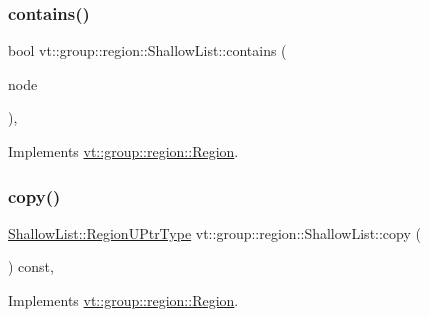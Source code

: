 \subsubsection{\texorpdfstring{contains()}{contains()}}
{\footnotesize\ttfamily bool vt\+::group\+::region\+::\+Shallow\+List\+::contains (\begin{DoxyParamCaption}\item[{\hyperlink{namespacevt_a866da9d0efc19c0a1ce79e9e492f47e2}{Node\+Type} const \&}]{node }\end{DoxyParamCaption})\hspace{0.3cm}{\ttfamily [override]}, {\ttfamily [virtual]}}



Implements \hyperlink{structvt_1_1group_1_1region_1_1_region_a1e0ebd7367476fb397faf06a03b5583c}{vt\+::group\+::region\+::\+Region}.

\mbox{\label{structvt_1_1group_1_1region_1_1_shallow_list_a43434547454d02f9069873282675058f}} 
\subsubsection{\texorpdfstring{copy()}{copy()}}
{\footnotesize\ttfamily \hyperlink{structvt_1_1group_1_1region_1_1_region_ae5f42cf159116a3cf8bd65423eb01037}{Shallow\+List\+::\+Region\+U\+Ptr\+Type} vt\+::group\+::region\+::\+Shallow\+List\+::copy (\begin{DoxyParamCaption}{ }\end{DoxyParamCaption}) const\hspace{0.3cm}{\ttfamily [override]}, {\ttfamily [virtual]}}



Implements \hyperlink{structvt_1_1group_1_1region_1_1_region_a040d20a4f8c6fa351d7fe1cbfcae3a03}{vt\+::group\+::region\+::\+Region}.

\mbox{\label{structvt_1_1group_1_1region_1_1_shallow_list_a3ca4276a7602a1ed44f02dfa7e600e88}} 
